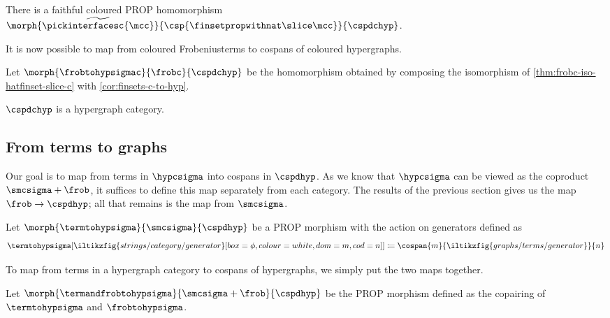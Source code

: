 \begin{corollary}\label{cor:finsets-c-to-hyp}
    There is a faithful coloured PROP homomorphism \(
    \morph{
        \widetilde{\pickinterfacesc{\mcc}}
    }{
        \csp{\finsetpropwithnat \slice \mcc}
    }{
        \cspdchyp
    }
    \).
\end{corollary}

It is now possible to map from coloured Frobeniusterms to cospans of coloured
hypergraphs.

\begin{definition}
    Let \(\morph{\frobtohypsigmac}{\frobc}{\cspdchyp}\) be the homomorphism
    obtained by composing the isomorphism of \cref{thm:frobc-iso-hatfinset-slice-c}
    with \cref{cor:finsets-c-to-hyp}.
\end{definition}

\begin{corollary}
    \(\cspdchyp\) is a hypergraph category.
\end{corollary}

\subsection{From terms to graphs}

Our goal is to map from terms in \(\hypcsigma\) into cospans in \(\cspdhyp\).
As we know that \(\hypcsigma\) can be viewed as the coproduct
\(\smcsigma + \frob\), it suffices to define this map separately from each
category.
The results of the previous section gives us the map \(\frob \to \cspdhyp\);
all that remains is the map from \(\smcsigma\).

\begin{definition}\label{def:hyp-morphisms}
    Let \(\morph{\termtohypsigma}{\smcsigma}{\cspdhyp}\) be a PROP
    morphism with the action on generators defined as \[
        \termtohypsigma[\iltikzfig{%
                strings/category/generator%
            }[box=\phi,colour=white,dom=m,cod=n]
        ]
        \coloneqq
        \cospan{m}{\iltikzfig{graphs/terms/generator}}{n}
    \]
\end{definition}

To map from terms in a hypergraph category to cospans of hypergraphs, we simply
put the two maps together.

\begin{definition}
    Let \(
    \morph{\termandfrobtohypsigma}{\smcsigma + \frob}{\cspdhyp}
    \) be the PROP morphism defined as the copairing of \(\termtohypsigma\) and
    \(\frobtohypsigma\).
\end{definition}

